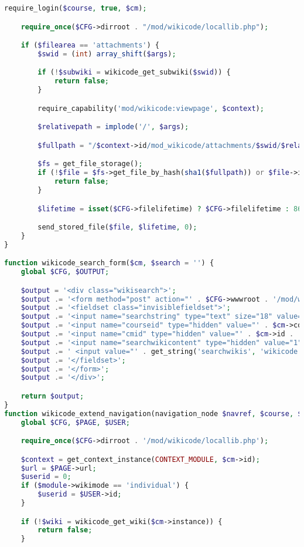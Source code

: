 \begin{lstlisting}[language=PHP]
    require_login($course, true, $cm);

    require_once($CFG->dirroot . "/mod/wikicode/locallib.php");

    if ($filearea == 'attachments') {
        $swid = (int) array_shift($args);

        if (!$subwiki = wikicode_get_subwiki($swid)) {
            return false;
        }

        require_capability('mod/wikicode:viewpage', $context);

        $relativepath = implode('/', $args);

        $fullpath = "/$context->id/mod_wikicode/attachments/$swid/$relativepath";

        $fs = get_file_storage();
        if (!$file = $fs->get_file_by_hash(sha1($fullpath)) or $file->is_directory()) {
            return false;
        }

        $lifetime = isset($CFG->filelifetime) ? $CFG->filelifetime : 86400;

        send_stored_file($file, $lifetime, 0);
    }
}

function wikicode_search_form($cm, $search = '') {
    global $CFG, $OUTPUT;

    $output = '<div class="wikisearch">';
    $output .= '<form method="post" action="' . $CFG->wwwroot . '/mod/wikicode/search.php" style="display:inline">';
    $output .= '<fieldset class="invisiblefieldset">';
    $output .= '<input name="searchstring" type="text" size="18" value="' . s($search, true) . '" alt="search" />';
    $output .= '<input name="courseid" type="hidden" value="' . $cm->course . '" />';
    $output .= '<input name="cmid" type="hidden" value="' . $cm->id . '" />';
    $output .= '<input name="searchwikicontent" type="hidden" value="1" />';
    $output .= ' <input value="' . get_string('searchwikis', 'wikicode') . '" type="submit" />';
    $output .= '</fieldset>';
    $output .= '</form>';
    $output .= '</div>';

    return $output;
}
function wikicode_extend_navigation(navigation_node $navref, $course, $module, $cm) {
    global $CFG, $PAGE, $USER;

    require_once($CFG->dirroot . '/mod/wikicode/locallib.php');

    $context = get_context_instance(CONTEXT_MODULE, $cm->id);
    $url = $PAGE->url;
    $userid = 0;
    if ($module->wikimode == 'individual') {
        $userid = $USER->id;
    }

    if (!$wiki = wikicode_get_wiki($cm->instance)) {
        return false;
    }


\end{lstlisting}

